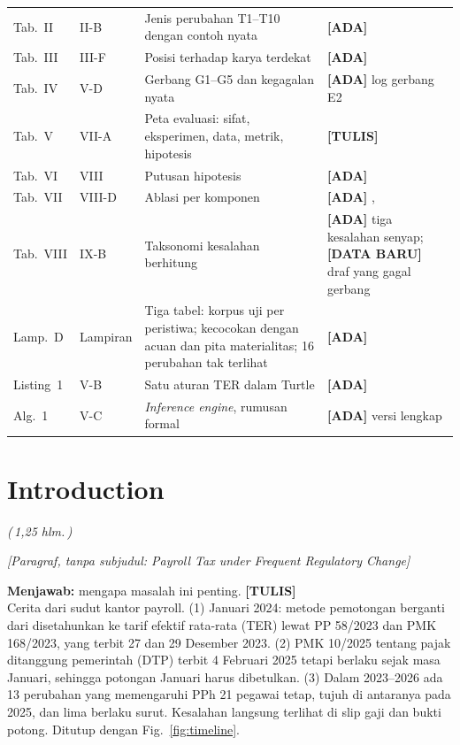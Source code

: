 \documentclass{ieeeaccess}
\newcommand{\ADA}{\textcolor{stada}{\textbf{[ADA]}}}
\newcommand{\TULIS}{\textcolor{sttulis}{\textbf{[TULIS]}}}
\newcommand{\BARU}{\textcolor{stbaru}{\textbf{[DATA BARU]}}}
\newcommand{\hal}[1]{\textcolor{draftblue}{\textit{(\,#1 hlm.\,)}}}
\newenvironment{isi}{\par\smallskip\footnotesize\color{draftblue}\noindent}{\par\smallskip\normalsize\color{black}}
\begin{document}
\begin{table}[!t]
\begin{tabularx}{\textwidth}{@{}P{0.9cm} P{1.1cm} L P{3.2cm}@{}}
Tab.~II & II-B & Jenis perubahan T1--T10 dengan contoh nyata & \ADA{} \\
Tab.~III & III-F & Posisi terhadap karya terdekat & \ADA{} \\
Tab.~IV & V-D & Gerbang G1--G5 dan kegagalan nyata & \ADA{} log gerbang E2 \\
Tab.~V & VII-A & Peta evaluasi: sifat, eksperimen, data, metrik, hipotesis & \TULIS{} \\
Tab.~VI & VIII & Putusan hipotesis & \ADA{}  \\
Tab.~VII & VIII-D & Ablasi per komponen & \ADA{} ,  \\
Tab.~VIII & IX-B & Taksonomi kesalahan berhitung & \ADA{} tiga kesalahan senyap; \BARU{} draf yang gagal gerbang \\
\midrule
Lamp.~D & Lampiran & Tiga tabel: korpus uji per peristiwa; kecocokan dengan acuan dan pita materialitas; 16 perubahan tak terlihat & \ADA{} \\
\midrule
Listing~1 & V-B & Satu aturan TER dalam Turtle & \ADA{} \\
Alg.~1 & V-C & \textit{Inference engine}, rumusan formal & \ADA{} versi lengkap \\
\bottomrule
\end{tabularx}
\end{table}
\addtocounter{table}{-1}

\section{Introduction}
\label{sec:intro}
\hal{1,25}

\noindent\textcolor{draftblue}{\textit{[Paragraf, tanpa subjudul: Payroll Tax under Frequent Regulatory Change]}}
\begin{isi}
\textbf{Menjawab:} mengapa masalah ini penting. \TULIS{}\\
Cerita dari sudut kantor payroll. (1) Januari 2024: metode pemotongan berganti dari disetahunkan ke tarif efektif rata-rata (TER) lewat PP 58/2023 dan PMK 168/2023, yang terbit 27 dan 29 Desember 2023. (2) PMK 10/2025 tentang pajak ditanggung pemerintah (DTP) terbit 4 Februari 2025 tetapi berlaku sejak masa Januari, sehingga potongan Januari harus dibetulkan. (3) Dalam 2023--2026 ada 13 perubahan yang memengaruhi PPh 21 pegawai tetap, tujuh di antaranya pada 2025, dan lima berlaku surut. Kesalahan langsung terlihat di slip gaji dan bukti potong. Ditutup dengan Fig.~\ref{fig:timeline}.
\end{isi}
\end{document}
